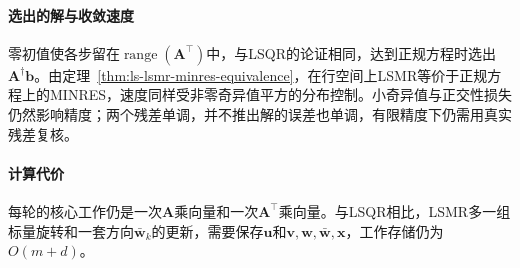 \paragraph{选出的解与收敛速度}
零初值使各步留在$\operatorname{range}(\bm A^\top)$中，与LSQR的论证相同，达到正规方程时选出$\bm A^\dagger\bm b$。由定理~\ref{thm:ls-lsmr-minres-equivalence}，在行空间上LSMR等价于正规方程上的MINRES，速度同样受非零奇异值平方的分布控制。小奇异值与正交性损失仍然影响精度；两个残差单调，并不推出解的误差也单调，有限精度下仍需用真实残差复核。

\paragraph{计算代价}
每轮的核心工作仍是一次$\bm A$乘向量和一次$\bm A^\top$乘向量。与LSQR相比，LSMR多一组标量旋转和一套方向$\bar{\bm w}_k$的更新，需要保存$\bm u$和$\bm v,\bm w,\bar{\bm w},\bm x$，工作存储仍为$O(m+d)$。
